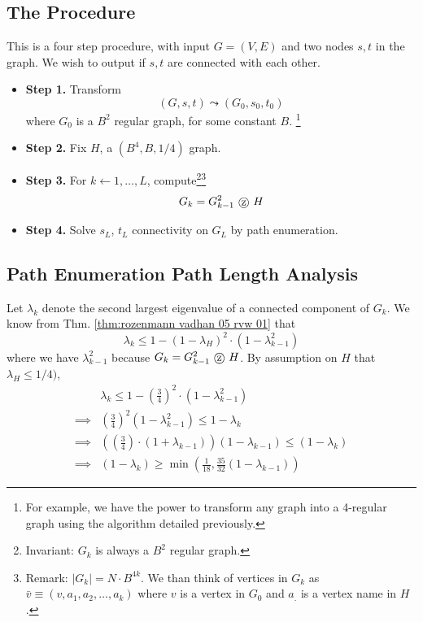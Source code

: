 \subsection{The Procedure}
\begin{algorithm}
This is a four step procedure, with input $G = (V, E)$ and two nodes $s, t$ in the graph. We wish to output if $s, t$ are connected with each other. 

\begin{itemize}
	\item \textbf{Step 1.} Transform 
		\begin{equation}
			(G, s, t) \leadsto (G_0, s_0, t_0)
		\end{equation}
		where $G_0$ is a $B^2$ regular graph, for some constant $B$. \footnote{For example, we have the power to transform any graph into a 4-regular graph using the algorithm detailed previously.}
	\item \textbf{Step 2.} Fix $H$, a $(B^4, B, 1/4)$ graph. 
	\item \textbf{Step 3.} For $k \gets 1, \dots, L$, compute\footnote{Invariant: $G_k$ is always a $B^2$ regular graph. }\footnote{Remark: $|G_k| = N \cdot B^{4k}$. We than think of vertices in $G_k$ as $\bar v \equiv (v, a_1, a_2, \dots, a_k)$ where $v$ is a vertex in $G_0$ and $a_.$ is a vertex name in $H$. }
		\begin{equation}
			G_k = G_{k - 1}^2 \tcircle{z} H
		\end{equation}
	\item \textbf{Step 4.} Solve $s_{L}$, $t_{L}$ connectivity on $G_L$ by path enumeration.  
\end{itemize}	
\end{algorithm}

\subsection{Path Enumeration Path Length Analysis}
Let $\lambda_k$ denote the second largest eigenvalue of a connected component of $G_k$. We know from Thm. \ref{thm:rozenmann vadhan 05 rvw 01} that 
\begin{equation}
	\lambda_k \leq 1 - (1 - \lambda_H) ^ 2 \cdot ( 1- \lambda_{k - 1} ^2 ) 
\end{equation}
where we have $\lambda_{k - 1} ^2$ because $G_k = G_{k - 1}^2 \tcircle{z} H$. By assumption on $H$ that $\lambda_H \leq 1/4)$, 
\begin{align}
	&\lambda_k \leq 1 - \left( \frac{3}{4} \right) ^ 2 \cdot (1 - \lambda_{k - 1}^2 ) \\
	\implies & \left( \frac{3}{4} \right) ^ 2 ( 1 - \lambda_{k - 1}^2 ) \leq 1 - \lambda_k \\
	\implies & \left( \left ( \frac{3}{4} \right) \cdot ( 1 + \lambda_{k - 1} ) \right) ( 1 - \lambda_{k - 1} )  \leq (1 - \lambda_k) \\
	\implies & (1 - \lambda_k) \geq \min \left( \frac{1}{18}, \frac{35}{32} ( 1 - \lambda_{k - 1} ) \right )
\end{align}

